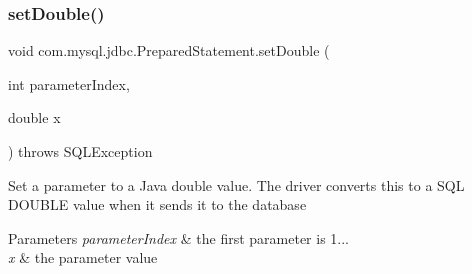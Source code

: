 \subsubsection{\texorpdfstring{set\+Double()}{setDouble()}}
{\footnotesize\ttfamily void com.\+mysql.\+jdbc.\+Prepared\+Statement.\+set\+Double (\begin{DoxyParamCaption}\item[{int}]{parameter\+Index,  }\item[{double}]{x }\end{DoxyParamCaption}) throws S\+Q\+L\+Exception}

Set a parameter to a Java double value. The driver converts this to a S\+QL D\+O\+U\+B\+LE value when it sends it to the database


\begin{DoxyParams}{Parameters}
{\em parameter\+Index} & the first parameter is 1... \\
\hline
{\em x} & the parameter value\\
\hline
\end{DoxyParams}

